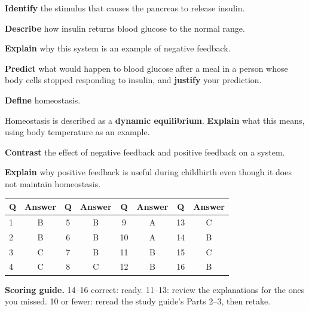 \documentclass[11pt,letterpaper]{article}
\begin{document}
\begin{parts}
  \item \textbf{Identify} the stimulus that causes the pancreas to release insulin.
  \item \textbf{Describe} how insulin returns blood glucose to the normal range.
  \item \textbf{Explain} why this system is an example of negative feedback.
  \item \textbf{Predict} what would happen to blood glucose after a meal in a person whose body cells stopped responding to insulin, and \textbf{justify} your prediction.
\end{parts}


\begin{parts}
  \item \textbf{Define} homeostasis.
  \item Homeostasis is described as a \textbf{dynamic equilibrium}. \textbf{Explain} what this means, using body temperature as an example.
  \item \textbf{Contrast} the effect of negative feedback and positive feedback on a system.
  \item \textbf{Explain} why positive feedback is useful during childbirth even though it does not maintain homeostasis.
\end{parts}

\answerkey


\begin{center}
\begin{tabular}{@{}lccccccc@{}}
\toprule
Q & Answer & Q & Answer & Q & Answer & Q & Answer \\
\midrule
1 & B & 5 & B & 9 & A & 13 & C \\
2 & B & 6 & B & 10 & A & 14 & B \\
3 & C & 7 & B & 11 & B & 15 & C \\
4 & C & 8 & C & 12 & B & 16 & B \\
\bottomrule
\end{tabular}
\end{center}

\textbf{Scoring guide.} 14–16 correct: ready. 11–13: review the explanations for the ones you missed. 10 or fewer: reread the study guide's Parts 2–3, then retake.

\end{document}
